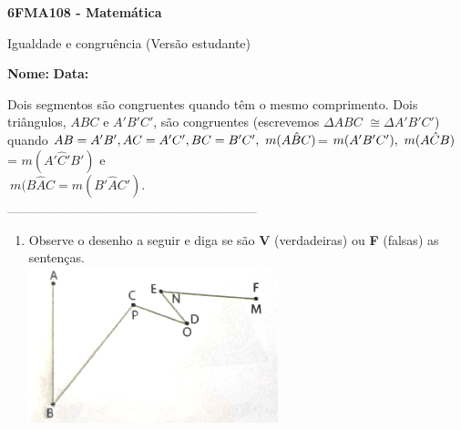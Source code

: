\documentclass[a4paper,14pt]{article}
\begin{document}
	
	\noindent\textbf{6FMA108 - Matemática} 
	
	\begin{center}Igualdade e congruência (Versão estudante)
	\end{center}
	
	\noindent\textbf{Nome:} \underline{\hspace{10cm}}
	\noindent\textbf{Data:} \underline{\hspace{4cm}}
	
	
	\begin{multicols}{2}
		\noindent Dois segmentos são congruentes quando têm o mesmo comprimento. Dois triângulos, $ABC$ e $A'B'C'$, são congruentes (escrevemos $\Delta$$ABC$ $\cong \Delta$$A'B'C'$) quando $AB = A'B', \\ AC = A'C', BC = B'C', \\~m(A\hat{B}C)$= $m(A'B'C'), \\~ m(A\hat{C}B)$ = $m(A'\hat{C}'B')$ e \\$~m(B\hat{A}C = m(B'\hat{A}C')$. \\
		\noindent\textsubscript{-----------------------------------------------------------------------}
		\begin{enumerate} 
			\item Observe o desenho a seguir e diga se são \textbf{V} (verdadeiras) ou \textbf{F} (falsas) as sentenças. \\
			\includegraphics[width=1\linewidth]{6FMA108_imagens/imagem1}
			\begin{enumerate}[a)]

\end{enumerate}
\end{enumerate}
\end{multicols}
\end{document}
